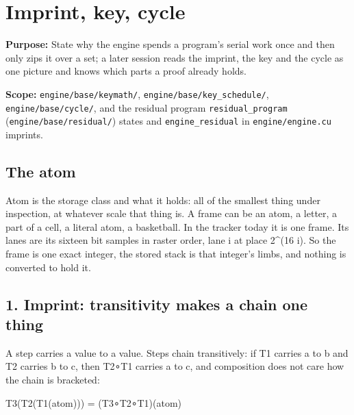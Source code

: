 \chapter{\texorpdfstring{Imprint, key, cycle}{Imprint, key, cycle}}
\label{chap:imprint-key-cycle}

\textbf{Purpose:} State why the engine spends a program's serial work once and then only zips it over a set; a later session reads the imprint, the key and the cycle as one picture and knows which parts a proof already holds.

\textbf{Scope:} \texttt{engine/\allowbreak{}base/\allowbreak{}keymath/\allowbreak{}}, \texttt{engine/\allowbreak{}base/\allowbreak{}key\_\allowbreak{}schedule/\allowbreak{}}, \texttt{engine/\allowbreak{}base/\allowbreak{}cycle/\allowbreak{}}, and the residual program \texttt{residual\_\allowbreak{}program} (\texttt{engine/\allowbreak{}base/\allowbreak{}residual/\allowbreak{}}) states and \texttt{engine\_\allowbreak{}residual} in \texttt{engine/\allowbreak{}engine.\allowbreak{}cu} imprints.

\section{\texorpdfstring{The atom}{The atom}}

Atom is the storage class and what it holds: all of the smallest thing under inspection, at whatever scale that thing is. A frame can be an atom, a letter, a part of a cell, a literal atom, a basketball. In the tracker today it is one frame. Its lanes are its sixteen bit samples in raster order, lane i at place 2\textasciicircum{}(16 i). So the frame is one exact integer, the stored stack is that integer's limbs, and nothing is converted to hold it.

\section{\texorpdfstring{1. Imprint: transitivity makes a chain one thing}{1. Imprint: transitivity makes a chain one thing}}

A step carries a value to a value. Steps chain transitively: if T1 carries a to b and T2 carries b to c, then T2∘T1 carries a to c, and composition does not care how the chain is bracketed:

T3(T2(T1(atom))) = (T3∘T2∘T1)(atom)

